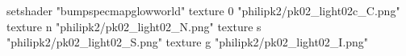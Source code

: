setshader "bumpspecmapglowworld"
    texture 0 "philipk2/pk02_light02c_C.png"
    texture n "philipk2/pk02_light02_N.png"
    texture s "philipk2/pk02_light02_S.png"
    texture g "philipk2/pk02_light02_I.png"